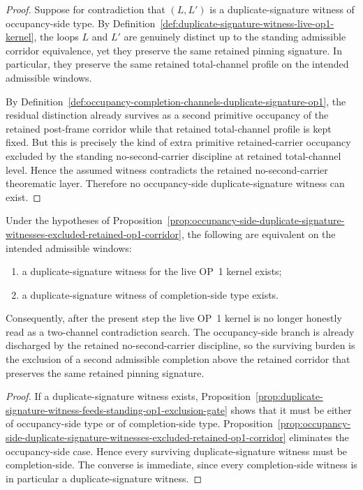 \begin{proof}
Suppose for contradiction that \((L,L')\) is a duplicate-signature witness of occupancy-side type. By Definition~\ref{def:duplicate-signature-witness-live-op1-kernel}, the loops \(L\) and \(L'\) are genuinely distinct up to the standing admissible corridor equivalence, yet they preserve the same retained pinning signature. In particular, they preserve the same retained total-channel profile on the intended admissible windows.

By Definition~\ref{def:occupancy-completion-channels-duplicate-signature-op1}, the residual distinction already survives as a second primitive occupancy of the retained post-frame corridor while that retained total-channel profile is kept fixed. But this is precisely the kind of extra primitive retained-carrier occupancy excluded by the standing no-second-carrier discipline at retained total-channel level. Hence the assumed witness contradicts the retained no-second-carrier theorematic layer. Therefore no occupancy-side duplicate-signature witness can exist.
\end{proof}

\begin{corollary}
\label{cor:live-op1-duplicate-signature-burden-reduces-completion-side-channel}
Under the hypotheses of Proposition~\ref{prop:occupancy-side-duplicate-signature-witnesses-excluded-retained-op1-corridor}, the following are equivalent on the intended admissible windows:
\begin{enumerate}[label=(\roman*)]
 \item a duplicate-signature witness for the live OP~1 kernel exists;
 \item a duplicate-signature witness of completion-side type exists.
\end{enumerate}
Consequently, after the present step the live OP~1 kernel is no longer honestly read as a two-channel contradiction search. The occupancy-side branch is already discharged by the retained no-second-carrier discipline, so the surviving burden is the exclusion of a second admissible completion above the retained corridor that preserves the same retained pinning signature.
\end{corollary}

\begin{proof}
If a duplicate-signature witness exists, Proposition~\ref{prop:duplicate-signature-witness-feeds-standing-op1-exclusion-gate} shows that it must be either of occupancy-side type or of completion-side type. Proposition~\ref{prop:occupancy-side-duplicate-signature-witnesses-excluded-retained-op1-corridor} eliminates the occupancy-side case. Hence every surviving duplicate-signature witness must be completion-side. The converse is immediate, since every completion-side witness is in particular a duplicate-signature witness.
\end{proof}

